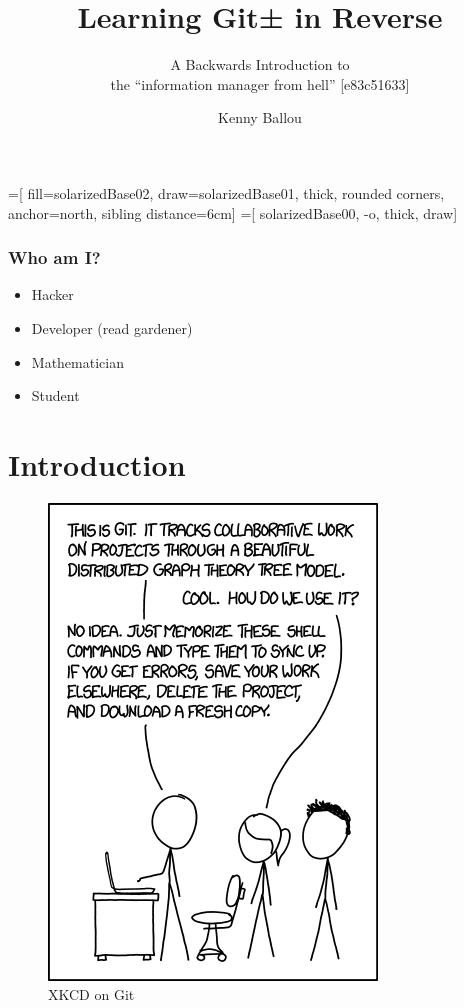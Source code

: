 \documentclass{beamer}
\title{Learning Git± in Reverse}
\subtitle{A Backwards Introduction to \\{} the ``information manager from
hell'' [e83c51633]}
\author[Ballou]{Kenny Ballou}
\begin{document}
=[%
    fill=solarizedBase02,
    draw=solarizedBase01,
    thick,
    rounded corners,
    anchor=north,
    sibling distance=6cm]
=[%
    solarizedBase00,
    -o,
    thick,
    draw]


\begin{frame}[label=titleslide]
\titlepage{}
\end{frame}

\begin{frame}
\tableofcontents[subsectionstyle=hide]
\end{frame}

\begin{frame}
\frametitle{Who am I?}
\begin{itemize}
\item{Hacker}
\item{Developer (read gardener)}
\item{Mathematician}
\item{Student}
\end{itemize}

\end{frame}

\section{Introduction}

\begin{frame}
\begin{figure}
\includegraphics[scale=0.45]{xkcd_git.png}
\caption{XKCD on Git\cite{website:xkcd_git_comic}}
\end{figure}
\end{frame}
\end{document}
